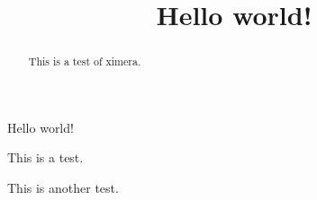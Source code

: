 \documentclass{ximera}
\begin{document}
\title{Hello world!}

\begin{abstract}
This is a test of ximera.
\end{abstract}

\maketitle

Hello world!

This is a test.

This is another test.
\end{document}

